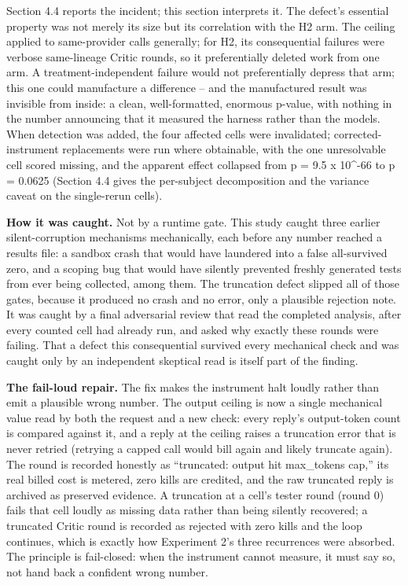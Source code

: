 \documentclass[
  11pt,
]{article}
\begin{document}
Section 4.4 reports the incident; this section interprets it. The
defect's essential property was not merely its size but its correlation
with the H2 arm. The ceiling applied to same-provider calls generally;
for H2, its consequential failures were verbose same-lineage Critic
rounds, so it preferentially deleted work from one arm. A
treatment-independent failure would not preferentially depress that arm;
this one could manufacture a difference -- and the manufactured result
was invisible from inside: a clean, well-formatted, enormous p-value,
with nothing in the number announcing that it measured the harness
rather than the models. When detection was added, the four affected
cells were invalidated; corrected-instrument replacements were run where
obtainable, with the one unresolvable cell scored missing, and the
apparent effect collapsed from p = 9.5 x 10\^{}-66 to p = 0.0625
(Section 4.4 gives the per-subject decomposition and the variance caveat
on the single-rerun cells).

\textbf{How it was caught.} Not by a runtime gate. This study caught
three earlier silent-corruption mechanisms mechanically, each before any
number reached a results file: a sandbox crash that would have laundered
into a false all-survived zero, and a scoping bug that would have
silently prevented freshly generated tests from ever being collected,
among them. The truncation defect slipped all of those gates, because it
produced no crash and no error, only a plausible rejection note. It was
caught by a final adversarial review that read the completed analysis,
after every counted cell had already run, and asked why exactly these
rounds were failing. That a defect this consequential survived every
mechanical check and was caught only by an independent skeptical read is
itself part of the finding.

\textbf{The fail-loud repair.} The fix makes the instrument halt loudly
rather than emit a plausible wrong number. The output ceiling is now a
single mechanical value read by both the request and a new check: every
reply's output-token count is compared against it, and a reply at the
ceiling raises a truncation error that is never retried (retrying a
capped call would bill again and likely truncate again). The round is
recorded honestly as ``truncated: output hit max\_tokens cap,'' its real
billed cost is metered, zero kills are credited, and the raw truncated
reply is archived as preserved evidence. A truncation at a cell's tester
round (round 0) fails that cell loudly as missing data rather than being
silently recovered; a truncated Critic round is recorded as rejected
with zero kills and the loop continues, which is exactly how Experiment
2's three recurrences were absorbed. The principle is fail-closed: when
the instrument cannot measure, it must say so, not hand back a confident
wrong number.
\end{document}
